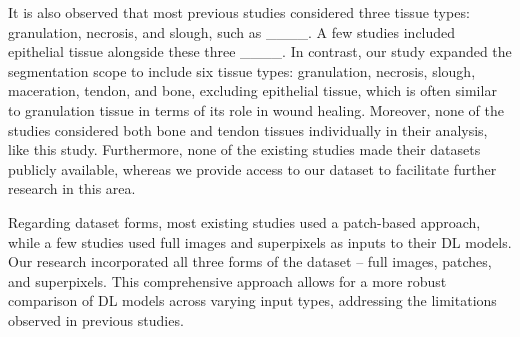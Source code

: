 It is also observed that most previous studies considered three tissue types: granulation, necrosis, and slough, such as ____. A few studies included epithelial tissue alongside these three ____. In contrast, our study expanded the segmentation scope to include six tissue types: granulation, necrosis, slough, maceration, tendon, and bone, excluding epithelial tissue, which is often similar to granulation tissue in terms of its role in wound healing. Moreover, none of the studies considered both bone and tendon tissues individually in their analysis, like this study.
Furthermore, none of the existing studies made their datasets publicly available, whereas we provide access to our dataset to facilitate further research in this area. 

Regarding dataset forms, most existing studies used a patch-based approach, while a few studies used full images and superpixels as inputs to their DL models. Our research incorporated all three forms of the dataset -- full images, patches, and superpixels. This comprehensive approach allows for a more robust comparison of DL models across varying input types, addressing the limitations observed in previous studies.